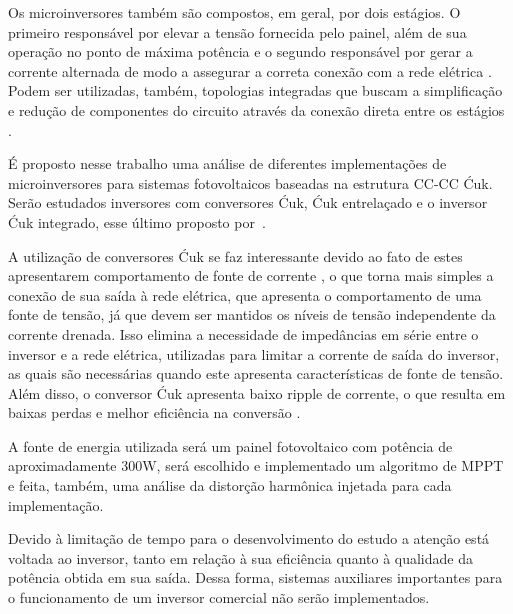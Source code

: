 \documentclass[
	12pt,				%
	openright,			%
	twoside,			%
	a4paper,			%
	english,			%
	french,				%
	spanish,			%
	brazil,				%
	]{abntex2}
\begin{document}
	Os microinversores também são compostos, em geral, por dois estágios. O primeiro responsável por elevar a tensão fornecida pelo painel, além de sua operação no ponto de máxima potência e o segundo responsável por gerar a corrente alternada de modo a assegurar a correta conexão com a rede elétrica \cite{Nezamuddin_des_eff_micro}. Podem ser utilizadas, também, topologias integradas que buscam a simplificação e redução de componentes do circuito através da conexão direta entre os estágios \cite{LUIGI_int_top} \cite{LUIGIJUNIOR_ev_int}.

	
	É proposto nesse trabalho uma análise de diferentes implementações de microinversores para sistemas fotovoltaicos baseadas na estrutura CC-CC Ćuk. Serão estudados inversores com conversores Ćuk, Ćuk entrelaçado e o inversor Ćuk integrado, esse último proposto por~\cite{LUIGI_int_top}.

	A utilização de conversores Ćuk se faz interessante devido ao fato de estes apresentarem comportamento de fonte de corrente \cite{LUIGIJUNIOR_ev_int}, o que torna mais simples a conexão de sua saída à rede elétrica, que apresenta o comportamento de uma fonte de tensão, já que devem ser mantidos os níveis de tensão independente da corrente drenada. Isso elimina a necessidade de impedâncias em série entre o inversor e a rede elétrica, utilizadas para limitar a corrente de saída do inversor, as quais são necessárias quando este apresenta características de fonte de tensão. Além disso, o conversor Ćuk apresenta baixo ripple de corrente, o que resulta em baixas perdas e melhor eficiência na conversão \cite{Shawky_perform_anal}.

	A fonte de energia utilizada será um painel fotovoltaico com potência de aproximadamente 300W, será escolhido e implementado um algoritmo de MPPT e feita, também,  uma análise da distorção harmônica injetada para cada implementação.

	Devido à limitação de tempo para o desenvolvimento do estudo a atenção está voltada ao inversor, tanto em relação à sua eficiência quanto à qualidade da potência obtida em sua saída. Dessa forma, sistemas auxiliares importantes para o funcionamento de um inversor comercial não serão implementados.

	
\end{document}
